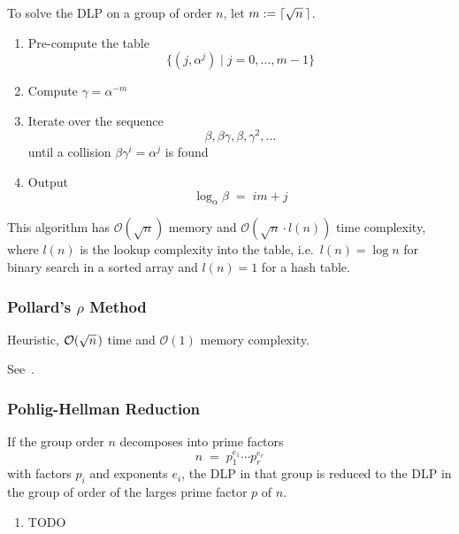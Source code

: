 \documentclass[a4paper]{scrartcl}
\newcommand\bigO{\mathcal O}
\begin{document}
To solve the DLP on a group of order $n$, let $m:=\lceil\sqrt n\kern2pt\rceil$.

\begin{enumerate}
    \item Pre-compute the table\[\{(j,\alpha^j)\mid j = 0,\hdots,m-1\}\]
    \item Compute $\gamma=\alpha^{-m}$
    \item Iterate over the sequence \[\beta,\beta\gamma,\beta,\gamma^2,\hdots\]
        until a collision $\beta\gamma^i=\alpha^j$ is found
    \item Output \[\log_\alpha\beta\;=\;im+j\]
\end{enumerate}

This algorithm has $\bigO(\sqrt n)$ memory and $\bigO(\sqrt n\cdot l(n))$ time complexity, where $l(n)$ is the lookup complexity into the table, i.e.\ $l(n)=\log n$ for binary search in a sorted array and $l(n)=1$ for a hash table.

\subsubsection{Pollard's $\rho$ Method}

Heuristic, $\bigO(\sqrt n\kern1pt)$ time and $\bigO(1)$ memory complexity.

See~\cite[p.~234]{imc}.

\subsubsection{Pohlig-Hellman Reduction}

If the group order $n$ decomposes into prime factors \[n\;=\;p_1^{e_1}\cdots p_r^{e_r}\]
with factors $p_i$ and exponents $e_i$, the DLP in that group is reduced to the DLP in the group of order of the larges prime factor $p$ of $n$.

\begin{enumerate}
    \item TODO
\end{enumerate}



\end{document}
